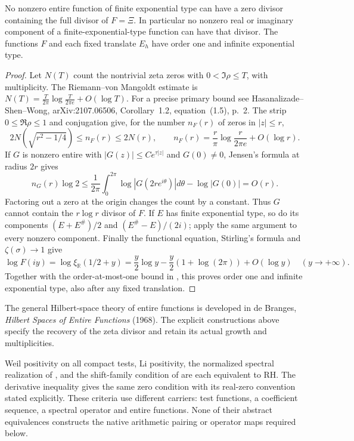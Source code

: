 \begin{proposition}
\label{v4-arith:consumer53:exponential-type}
No nonzero entire function of finite exponential type can have a
zero divisor containing the full divisor of $F=\Xi$.
In particular no nonzero real or imaginary component of a
finite-exponential-type function can have that divisor.
The functions $F$ and each fixed translate $E_h$ have order one
and infinite exponential type.
\end{proposition}
\begin{proof}
Let $N(T)$ count the nontrivial zeta zeros with $0<\Im\rho\le T$,
with multiplicity. The Riemann--von Mangoldt estimate is
$N(T)=\frac{T}{2\pi}\log\frac{T}{2\pi e}+O(\log T)$.
For a precise primary bound see Hasanalizade--Shen--Wong,
arXiv:2107.06506, Corollary~1.2, equation~(1.5), p.~2.
The strip $0\le\Re\rho\le1$ and conjugation give, for the number
$n_F(r)$ of zeros in $|z|\le r$,
\[
 2N(\sqrt{r^2-1/4})\le n_F(r)\le2N(r),\qquad
 n_F(r)=\frac r\pi\log\frac r{2\pi e}+O(\log r).
\]
If $G$ is nonzero entire with $|G(z)|\le Ce^{\tau|z|}$ and
$G(0)\ne0$, Jensen's formula at radius $2r$ gives
\[
 n_G(r)\log2\le
 \frac1{2\pi}\int_0^{2\pi}\log|G(2re^{i\theta})|d\theta
 -\log|G(0)|=O(r).
\]
Factoring out a zero at the origin changes the count by a constant.
Thus $G$ cannot contain the $r\log r$ divisor of $F$.
If $E$ has finite exponential type, so do its components
$(E+E^\#)/2$ and $(E^\#-E)/(2i)$; apply the same argument to every
nonzero component.
Finally the functional equation, Stirling's formula and
$\zeta(\sigma)\to1$ give
\[
 \log F(iy)=\log\xi_{\mathbb R}(1/2+y)
 =\frac y2\log y-\frac y2(1+\log(2\pi))+O(\log y)
 \quad(y\to+\infty).
\]
Together with the order-at-most-one bound in
, this proves order one and infinite
exponential type, also after any fixed translation.
\end{proof}
The general Hilbert-space theory of entire functions is developed in
de Branges, \emph{Hilbert Spaces of Entire Functions} (1968).
The explicit constructions above specify the recovery of the zeta
divisor and retain its actual growth and multiplicities.

\begin{remark}
\label{v4-arith:w5-direct:rem:four-equivalents}
Weil positivity on all compact tests, Li positivity, the normalized
spectral realization of , and
the shift-family condition of 
are each equivalent to RH. The derivative inequality gives the
same zero condition with its real-zero convention stated explicitly.
These criteria use different carriers: test functions, a coefficient
sequence, a spectral operator and entire functions. None of their
abstract equivalences constructs the native arithmetic pairing or
operator maps required below.
\end{remark}

